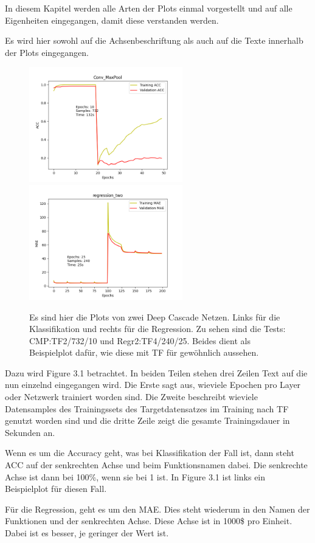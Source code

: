 In diesem Kapitel werden alle Arten der Plots einmal vorgestellt und auf alle Eigenheiten eingegangen, damit diese verstanden werden. 

Es wird hier sowohl auf die Achsenbeschriftung als auch auf die Texte innerhalb der Plots eingegangen. 

\begin{figure}[htpb]
    \includegraphics[height=5cm]{../../Plots/ba_plots/convmaxpool/2TFtr.png}
    \includegraphics[height=5cm]{../../Plots/ba_plots/regr2/regr2train.png}
    \caption{\label{fig:ploterkl} 
    \small{Es sind hier die Plots von zwei Deep Cascade Netzen. Links für die Klassifikation und rechts für die Regression. 
    Zu sehen sind die Tests: CMP:TF2/732/10 und Regr2:TF4/240/25. Beides dient als Beispielplot dafür, wie diese mit TF für 
    gewöhnlich aussehen. }}
\end{figure}

Dazu wird Figure 3.1 betrachtet. In beiden Teilen stehen drei Zeilen Text auf die nun einzelnd eingegangen wird. Die Erste sagt aus, 
wieviele Epochen pro Layer oder Netzwerk trainiert worden sind. Die Zweite beschreibt wieviele Datensamples des Trainingssets des 
Targetdatensatzes im Training nach TF genutzt worden sind und die dritte Zeile zeigt die gesamte Trainingsdauer in Sekunden an. 

Wenn es um die Accuracy geht, was bei Klassifikation der Fall ist, dann steht ACC auf der senkrechten Achse und beim Funktionsnamen dabei. 
Die senkrechte Achse ist dann bei 100\%, wenn sie bei 1 ist. In Figure 3.1 ist links ein Beispielplot für diesen Fall. 

Für die Regression, geht es um den MAE. Dies steht wiederum in den Namen der Funktionen und der senkrechten Achse. Diese Achse ist in 1000\$ pro 
Einheit. Dabei ist es besser, je geringer der Wert ist. 
